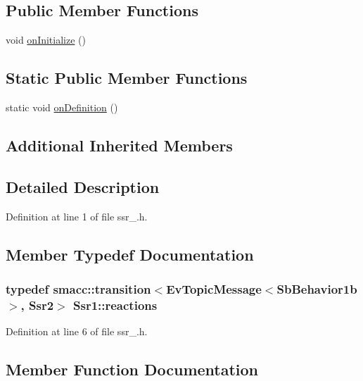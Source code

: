 \subsection*{Public Member Functions}
\begin{DoxyCompactItemize}
\item 
void \hyperlink{structSsr1_a59439edce482be88854d1efb41f9e676}{on\+Initialize} ()
\end{DoxyCompactItemize}
\subsection*{Static Public Member Functions}
\begin{DoxyCompactItemize}
\item 
static void \hyperlink{structSsr1_a13808ade81c6393613fd27db45c00c94}{on\+Definition} ()
\end{DoxyCompactItemize}
\subsection*{Additional Inherited Members}


\subsection{Detailed Description}


Definition at line 1 of file ssr\+\_.\+h.



\subsection{Member Typedef Documentation}
\subsubsection[{\texorpdfstring{reactions}{reactions}}]{\setlength{\rightskip}{0pt plus 5cm}typedef {\bf smacc\+::transition}$<$Ev\+Topic\+Message$<$Sb\+Behavior1b$>$, {\bf Ssr2}$>$ {\bf Ssr1\+::reactions}}\hypertarget{structSsr1_a3235ebe7e1d5b4d482fb531680f1c395}{}\label{structSsr1_a3235ebe7e1d5b4d482fb531680f1c395}


Definition at line 6 of file ssr\+\_.\+h.



\subsection{Member Function Documentation}
